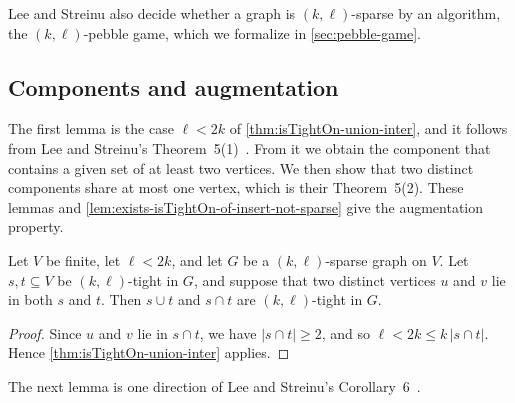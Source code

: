 Lee and Streinu also decide whether a graph is $(k, \ell)$-sparse by an
algorithm, the $(k, \ell)$-pebble game, which we formalize in
\cref{sec:pebble-game}.

\subsection{Components and augmentation}
\label{sec:count-matroid-aug}

The first lemma is the case $\ell < 2k$ of
\cref{thm:isTightOn-union-inter}, and it follows from Lee and Streinu's
Theorem~5(1)~\cite{leeStreinu2008}. From it we obtain the component
that contains a given set of at least two vertices. We then show that
two distinct components share at most one vertex, which is their
Theorem~5(2). These lemmas and
\cref{lem:exists-isTightOn-of-insert-not-sparse} give the augmentation
property.

\begin{lemma}
  \label{lem:isTightOn-union-inter-of-pair}
  \leanok
  Let $V$ be finite, let $\ell < 2k$, and let $G$ be a
  $(k, \ell)$-sparse graph on $V$. Let $s, t \subseteq V$ be
  $(k, \ell)$-tight in $G$, and suppose that two distinct vertices $u$
  and $v$ lie in both $s$ and $t$. Then $s \cup t$ and $s \cap t$ are
  $(k, \ell)$-tight in $G$.
\end{lemma}
\begin{proof}
  \leanok
  Since $u$ and $v$ lie in $s \cap t$, we have $|s \cap t| \ge 2$, and
  so $\ell < 2k \le k\,|s \cap t|$. Hence
  \cref{thm:isTightOn-union-inter} applies.
\end{proof}

The next lemma is one direction of Lee and Streinu's
Corollary~6~\cite{leeStreinu2008}.

